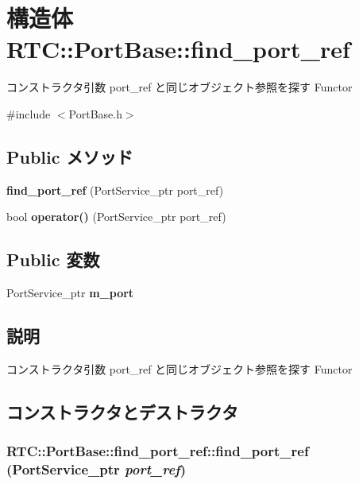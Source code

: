 \section{構造体 RTC::PortBase::find\_\-port\_\-ref}
\label{structRTC_1_1PortBase_1_1find__port__ref}


コンストラクタ引数 port\_\-ref と同じオブジェクト参照を探す Functor  




{\ttfamily \#include $<$PortBase.h$>$}

\subsection*{Public メソッド}
\begin{DoxyCompactItemize}
\item 
{\bf find\_\-port\_\-ref} (PortService\_\-ptr port\_\-ref)
\item 
bool {\bf operator()} (PortService\_\-ptr port\_\-ref)
\end{DoxyCompactItemize}
\subsection*{Public 変数}
\begin{DoxyCompactItemize}
\item 
PortService\_\-ptr {\bf m\_\-port}
\end{DoxyCompactItemize}


\subsection{説明}
コンストラクタ引数 port\_\-ref と同じオブジェクト参照を探す Functor 

\subsection{コンストラクタとデストラクタ}
\subsubsection[{find\_\-port\_\-ref}]{\setlength{\rightskip}{0pt plus 5cm}RTC::PortBase::find\_\-port\_\-ref::find\_\-port\_\-ref (PortService\_\-ptr {\em port\_\-ref})\hspace{0.3cm}{\ttfamily  [inline]}}\label{structRTC_1_1PortBase_1_1find__port__ref_a67c224b2a7b154dd2654f759576fea52}


